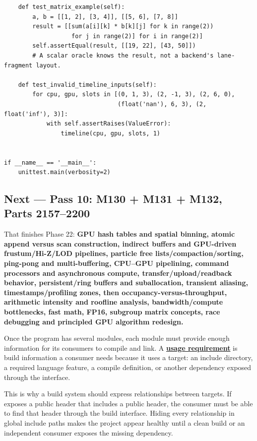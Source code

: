 \begin{verbatim}
    def test_matrix_example(self):
        a, b = [[1, 2], [3, 4]], [[5, 6], [7, 8]]
        result = [[sum(a[i][k] * b[k][j] for k in range(2))
                   for j in range(2)] for i in range(2)]
        self.assertEqual(result, [[19, 22], [43, 50]])
        # A scalar oracle knows the result, not a backend's lane-fragment layout.

    def test_invalid_timeline_inputs(self):
        for cpu, gpu, slots in [(0, 1, 3), (2, -1, 3), (2, 6, 0),
                                (float('nan'), 6, 3), (2, float('inf'), 3)]:
            with self.assertRaises(ValueError):
                timeline(cpu, gpu, slots, 1)


if __name__ == '__main__':
    unittest.main(verbosity=2)
\end{verbatim}

\subsection{Next --- Pass 10: M130 + M131 + M132, Parts 2157--2200}\label{03-visual-computing-i-ch016-next-pass-10-m130-m131-m132-parts-21572200}

\hypertarget{03-visual-computing-i-ch016-next-pass-10-m130-m131-m132-parts-21572200}{}

That finishes Phase 22: \textbf{GPU hash tables and spatial binning, atomic append versus scan construction, indirect buffers and GPU-driven frustum/Hi-Z/LOD pipelines, particle free lists/compaction/sorting, ping-pong and multi-buffering, CPU--GPU pipelining, command processors and asynchronous compute, transfer/upload/readback behavior, persistent/ring buffers and suballocation, transient aliasing, timestamps/profiling zones, then occupancy-versus-throughput, arithmetic intensity and roofline analysis, bandwidth/compute bottlenecks, fast math, FP16, subgroup matrix concepts, race debugging and principled GPU algorithm redesign.}

Once the program has several modules, each module must provide enough information for its consumers to compile and link. A \textbf{\hyperref[appendix-3327b8977adf]{usage requirement}} is build information a consumer needs because it uses a target: an include directory, a required language feature, a compile definition, or another dependency exposed through the interface.

This is why a build system should express relationships between targets. If  exposes a public header that includes a public  header, the consumer must be able to find that header through the build interface. Hiding every relationship in global include paths makes the project appear healthy until a clean build or an independent consumer exposes the missing dependency.

